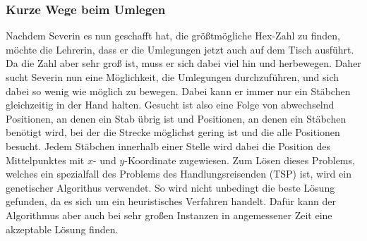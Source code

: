 \documentclass[a4paper,10pt,ngerman]{scrartcl}
\begin{document}
\subsubsection{Kurze Wege beim Umlegen}
Nachdem Severin es nun geschafft hat, die größtmögliche Hex-Zahl zu finden, möchte die Lehrerin, dass er die Umlegungen jetzt auch auf dem Tisch ausführt. Da die Zahl aber sehr groß ist, muss er sich dabei viel hin und herbewegen. Daher sucht Severin nun eine Möglichkeit, die Umlegungen durchzuführen, und sich dabei so wenig wie möglich zu bewegen. 
Dabei kann er immer nur ein Stäbchen gleichzeitig in der Hand halten.
Gesucht ist also eine Folge von abwechselnd Positionen, an denen ein Stab übrig ist und Positionen, an denen ein Stäbchen benötigt wird, bei der die Strecke möglichst gering ist und die alle Positionen besucht. 
Jedem Stäbchen innerhalb einer Stelle wird dabei die Position des Mittelpunktes mit $x$- und $y$-Koordinate zugewiesen. 
Zum Lösen dieses Problems, welches ein spezialfall des Problems des Handlungsreisenden (TSP) ist, wird ein genetischer Algorithus verwendet. 
So wird nicht unbedingt die beste Lösung gefunden, da es sich um ein heuristisches Verfahren handelt. 
Dafür kann der Algorithmus aber auch bei sehr großen Instanzen in angemessener Zeit eine akzeptable Lösung finden. 
\end{document}

